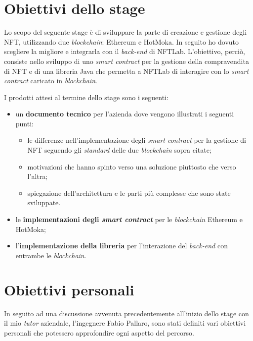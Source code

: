 
\section{Obiettivi dello stage}
Lo scopo del seguente stage è di sviluppare la parte di creazione e gestione degli NFT, utilizzando due \textit{blockchain}: Ethereum e HotMoka. In seguito ho dovuto scegliere la migliore e integrarla con il \textit{back-end} di NFTLab. L'obiettivo, perciò, consiste nello sviluppo di uno \textit{smart contract} per la gestione della compravendita di NFT e di una libreria Java che permetta a NFTLab di interagire con lo \textit{smart contract} caricato in \textit{blockchain}. \newline

\noindent I prodotti attesi al termine dello stage sono i seguenti:
\begin{itemize}
  \item un \textbf{documento tecnico} per l'azienda dove vengono illustrati i seguenti punti:
  \begin{itemize}
    \item le differenze nell'implementazione degli \textit{smart contract} per la gestione di NFT seguendo gli \textit{standard} delle due \textit{blockchain} sopra citate;
    \item motivazioni che hanno spinto verso una soluzione piuttosto che verso l'altra;
    \item spiegazione dell'architettura e le parti più complesse che sono state sviluppate.
  \end{itemize}
  \item le \textbf{implementazioni degli \textit{smart contract}} per le \textit{blockchain} Ethereum e HotMoka;
  \item l'\textbf{implementazione della libreria} per l'interazione del \textit{back-end} con entrambe le \textit{blockchain}.
\end{itemize}

\section{Obiettivi personali}
In seguito ad una discussione avvenuta precedentemente all'inizio dello stage con il mio \textit{tutor} aziendale, l'ingegnere Fabio Pallaro, sono stati definiti vari obiettivi personali che potessero approfondire ogni aspetto del percorso. \\

